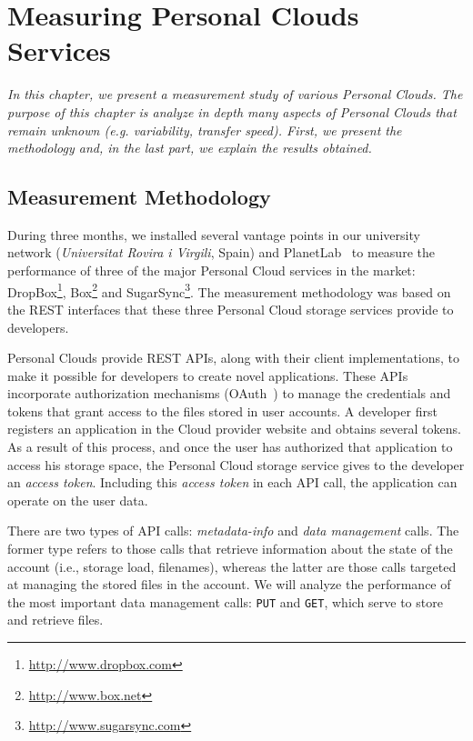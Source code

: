 \chapter{Measuring Personal Clouds Services}

\emph{In this chapter, we present a measurement study of various Personal
Clouds. The purpose of this chapter is analyze in depth many aspects of Personal
Clouds that remain unknown (e.g. variability, transfer speed). First, we present the
methodology and, in the last part, we explain the results obtained. }

\section{Measurement Methodology}
During three months, we installed several
vantage points in our university network (\textit{Universitat
Rovira i Virgili}, Spain) and PlanetLab~\cite{planetlab}  
to measure the performance of three of the major Personal Cloud services in the market: DropBox\footnote{\url{http://www.dropbox.com}}, Box\footnote{\url{http://www.box.net}} 
and SugarSync\footnote{\url{http://www.sugarsync.com}}. The measurement methodology was based on the REST interfaces that these three Personal Cloud storage services provide to developers.

Personal Clouds provide REST APIs, along with
their client implementations, to make it possible for developers to
create novel applications. These APIs incorporate authorization
mechanisms (OAuth~\cite{oauth}) to manage the credentials and tokens
that grant access to the files stored in user accounts. A
developer first registers an application 
in the Cloud provider website and obtains several tokens.
As a result of this process, and once the user has authorized
that application to access his storage space, the Personal Cloud storage service
gives to the developer an \textit{access token}. Including this \textit{access token} in each API call, the application can operate on the user data.

There are two types of API calls: \textit{metadata-info} and
\textit{data management} calls. The former type refers to
those calls that retrieve information about the state of the
account (i.e., storage load, filenames), whereas the latter
are those calls targeted at managing the stored files
in the account. %
We will analyze the performance
of the most important data management calls: \texttt{PUT} and \texttt{GET},
which serve to store and retrieve files.  


